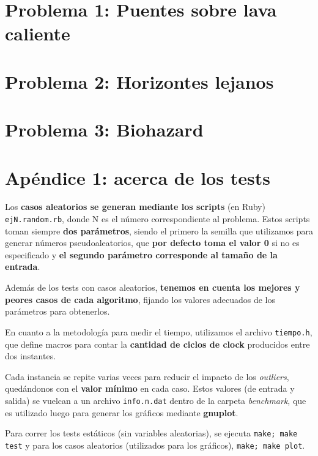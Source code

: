 \documentclass[a4paper]{article}
\begin{document}
\newpage

\section{Problema 1: Puentes sobre lava caliente}


\newpage

\section{Problema 2: Horizontes lejanos}


\newpage

\section{Problema 3: Biohazard}


\newpage

\section{Apéndice 1: acerca de los tests}
Los \textbf{casos aleatorios se generan mediante los scripts} (en Ruby) \verb|ejN.random.rb|, donde
N es el número correspondiente al problema. Estos scripts toman siempre \textbf{dos parámetros},
siendo el primero la semilla que utilizamos para generar números pseudoaleatorios, que
\textbf{por defecto toma el valor 0} si no es especificado y \textbf{el segundo parámetro corresponde
al tamaño de la entrada}.

Además de los tests con casos aleatorios, \textbf{tenemos en cuenta los mejores y peores
casos de cada algoritmo}, fijando los valores adecuados de los parámetros para
obtenerlos. \medskip

En cuanto a la metodología para medir el tiempo, utilizamos el archivo \verb|tiempo.h|,
que define macros para contar la \textbf{cantidad de ciclos de clock} producidos entre dos instantes. \medskip

Cada instancia se repite varias veces para reducir el impacto de los \textit{outliers}, quedándonos
con el \textbf{valor mínimo} en cada caso. Estos valores (de entrada y salida) se vuelcan a un archivo
\verb|info.n.dat| dentro de la carpeta \textit{benchmark}, que es utilizado luego para generar los gráficos
mediante \textbf{gnuplot}. \medskip

Para correr los tests estáticos (sin variables aleatorias), se ejecuta \verb|make; make test| y para los
casos aleatorios (utilizados para los gráficos), \verb|make; make plot|.
\end{document}
